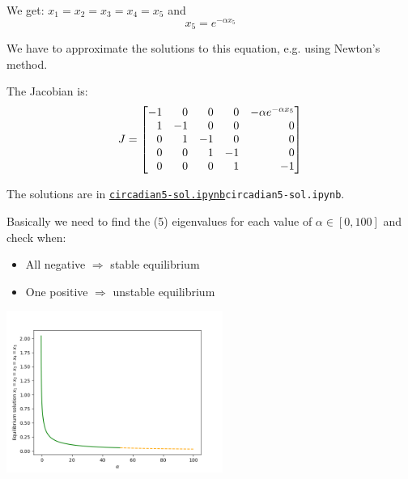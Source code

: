 \documentclass{workbook}
\begin{document}
\begin{solution}

\begin{slide}

\begin{parts}
	\item We get: $x_1 = x_2 = x_3 = x_4 = x_5$ and
	\[ x_5 = e^{-\alpha x_5} \]
	
	We have to approximate the solutions to this equation, e.g. using Newton's method.
	
	\item The Jacobian is:
		\[ J = 
			\mat { 	-1 & 0 & 0 & 0 & -\alpha e^{-\alpha x_5} \\
					1 & -1 & 0 & 0 & 0 \\
					0 & 1 & -1 & 0 &  0 \\
					0 & 0 & 1 & -1 &  0 \\
					0 & 0 & 0 & 1 & -1 
					}
		\]	
	\item The solutions are in \href{https://utoronto.syzygy.ca/jupyter/user-redirect/git-pull?repo=https://github.com/bigfatbernie/IBLMathModeling&subPath=python/circadian.ipynb}{\tt circadian5-sol.ipynb}{\tt circadian5-sol.ipynb}.
	
	Basically we need to find the (5) eigenvalues for each value of $\alpha \in [0,100]$ and check when:
	\begin{itemize}
		\item All negative $\Rightarrow $ stable equilibrium
		\item One positive $\Rightarrow $ unstable equilibrium
	\end{itemize}
	
	\includegraphics[width=200pt]{images/circadian5.png}
	
\end{parts}
	
\end{slide}	
\end{solution}
\end{document}
